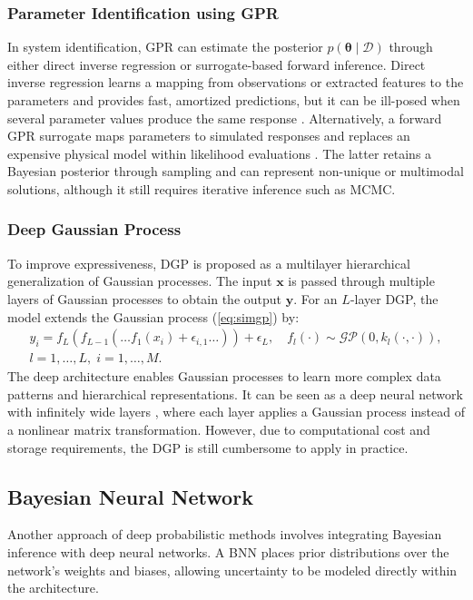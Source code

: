 \subsubsection{Parameter Identification using GPR}
In system identification, \ac{GPR} can estimate the posterior $p(\boldsymbol{\theta}\mid\mathcal{D})$ through either direct inverse regression or surrogate-based forward inference. Direct inverse regression learns a mapping from observations or extracted features to the parameters and provides fast, amortized predictions, but it can be ill-posed when several parameter values produce the same response \citep{li2025gaussianprocessregressioninverse}. Alternatively, a forward \ac{GPR} surrogate maps parameters to simulated responses and replaces an expensive physical model within likelihood evaluations \citep{takhtaganov2018adaptivegaussianprocesssurrogates}. The latter retains a Bayesian posterior through sampling and can represent non-unique or multimodal solutions, although it still requires iterative inference such as \ac{MCMC}.

\subsubsection{Deep Gaussian Process}
To improve expressiveness, \acf{DGP} \citep{damianou2013dgp} is proposed as a multilayer hierarchical generalization of Gaussian processes. The input $\boldsymbol{x}$ is passed through multiple layers of Gaussian processes to obtain the output $\boldsymbol{y}$. For an $L$-layer \ac{DGP}, the model extends the Gaussian process (\ref{eq:simgp}) by:
\begin{multline}
    y_i = f_{L}(f_{L-1}(\dots f_{1}(x_i)+\epsilon_{i,1}\dots)) + \epsilon_{L}, \quad f_{l}(\cdot) \sim \mathcal{GP}(0, k_l(\cdot, \cdot)), \\ l=1,\dots,L,\; i=1,\dots,M.
\end{multline}  
The deep architecture enables Gaussian processes to learn more complex data patterns and hierarchical representations. It can be seen as a deep neural network with infinitely wide layers \citep{Neal1996}, where each layer applies a Gaussian process instead of a nonlinear matrix transformation. However, due to computational cost and storage requirements, the \ac{DGP} is still cumbersome to apply in practice. 

\subsection{Bayesian Neural Network}
Another approach of deep probabilistic methods involves integrating Bayesian inference with deep neural networks. A \acf{BNN} \citep{Neal1996, MacKay1992} places prior distributions over the network’s weights and biases, allowing uncertainty to be modeled directly within the architecture. 

